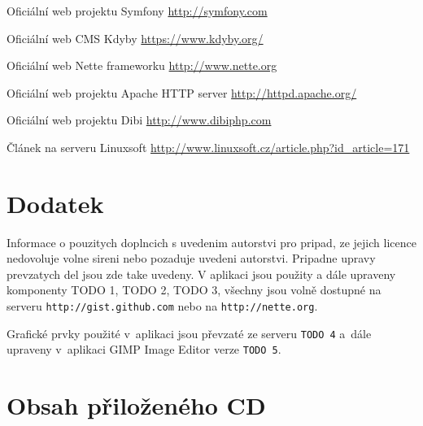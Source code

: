 \documentclass[11pt,oneside]{fithesis}
\begin{document}
\begin{thebibliography}{99}
 Oficiální web projektu Symfony
\url{http://symfony.com}

 Oficiální web CMS Kdyby
\url{https://www.kdyby.org/}

 Oficiální web Nette frameworku
\url{http://www.nette.org}

 Oficiální web projektu Apache HTTP server
\url{http://httpd.apache.org/}

 Oficiální web projektu Dibi
\url{http://www.dibiphp.com}

 Článek na serveru Linuxsoft 
\url{http://www.linuxsoft.cz/article.php?id_article=171}

\end{thebibliography}






























\newpage
\appendix
\chapter{Dodatek}
Informace o pouzitych doplncich s uvedenim autorstvi pro pripad, ze jejich licence nedovoluje volne sireni nebo pozaduje uvedeni autorstvi. Pripadne upravy prevzatych del jsou zde take uvedeny.
V aplikaci jsou použity a dále upraveny komponenty TODO 1, TODO 2, TODO 3, všechny jsou volně dostupné na serveru \verb|http://gist.github.com| nebo na \verb|http://nette.org|.

Grafické prvky použité v~aplikaci jsou převzaté ze serveru \verb|TODO 4| a~dále upraveny v~aplikaci GIMP Image Editor verze \verb|TODO 5|.

\newpage
\chapter{Obsah přiloženého CD} 
\end{document}
